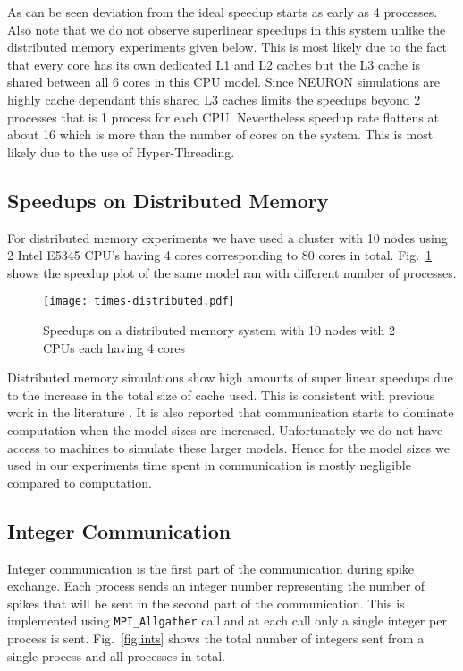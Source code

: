 \documentclass{article}
\begin{document}
As can be seen deviation from the ideal speedup starts as early as 4 processes.
Also note that we do not observe superlinear speedups in this system unlike the distributed memory experiments given below.
This is most likely due to the fact that every core has its own dedicated L1 and L2 caches but the L3 cache is shared between all 6 cores in this CPU model.
Since NEURON simulations are highly cache dependant this shared L3 caches limits the speedups beyond 2 processes that is 1 process for each CPU.
Nevertheless speedup rate flattens at about 16 which is more than the number of cores on the system.
This is most likely due to the use of Hyper-Threading.

\subsection{Speedups on Distributed Memory}

For distributed memory experiments we have used a cluster with 10 nodes using 2 Intel E5345 CPU's having 4 cores corresponding to 80 cores in total.
Fig.~\ref{fig:times-distributed} shows the speedup plot of the same model ran with different number of processes.

\begin{figure}
  \centering
  \texttt{[image: times-distributed.pdf]}
  \caption{Speedups on a distributed memory system with 10 nodes with 2 CPUs each having 4 cores}
  \label{fig:times-distributed}
\end{figure}

Distributed memory simulations show high amounts of super linear speedups due to the increase in the total size of cache used.
This is consistent with previous work in the literature \cite{migliore_parallel_2006}.
It is also reported that communication starts to dominate computation when the model sizes are increased.
Unfortunately we do not have access to machines to simulate these larger models.
Hence for the model sizes we used in our experiments time spent in communication is mostly negligible compared to computation.

\subsection{Integer Communication}

Integer communication is the first part of the communication during spike exchange.
Each process sends an integer number representing the number of spikes that will be sent in the second part of the communication.
This is implemented using \texttt{MPI\_Allgather} call and at each call only a single integer per process is sent.
Fig.~\ref{fig:ints} shows the total number of integers sent from a single process and all processes in total.
\end{document}
